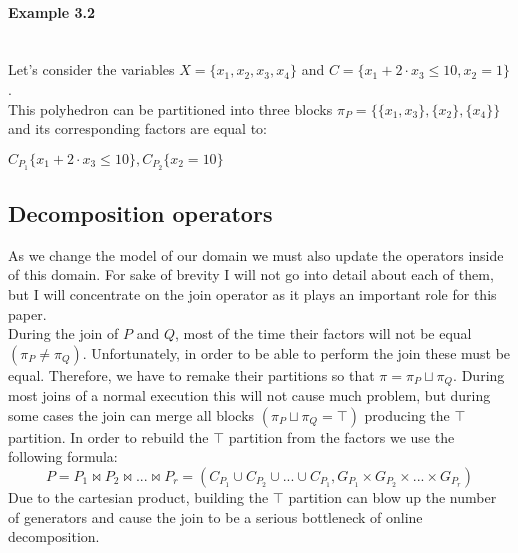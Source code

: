 
\paragraph{Example 3.2} \mbox{}\\
Let's consider the variables $X = \{x_1,x_2,x_3,x_4\}$ and $C = \{ x_1 + 2 \cdot x_3 \leq 10, x_2 = 1 \}$.\\
This polyhedron can be partitioned into three blocks $\pi_P = \{\{x_1,x_3\},\{x_2\},\{x_4\}\}$ and its corresponding factors are equal to:
\begin{center}
	$C_{P_1}\{x_1 + 2\cdot x_3 \leq 10 \} , C_{P_2}\{x_2 = 10 \}$
\end{center}


\subsection{Decomposition operators}
As we change the model of our domain we must also update the operators inside of this domain. For sake of brevity I will not go into detail about each of them, but I will concentrate on the join operator as it plays an important role for this paper.\\
During the join of $P$ and $Q$, most of the time their factors will not be equal$(\pi_P \neq \pi_Q)$. Unfortunately, in order to be able to perform the join these must be equal. 
 Therefore, we have to remake their partitions so that $\pi = \pi_P\sqcup\pi_Q$. During most joins of a normal execution this will not cause much problem, but during some cases the join can merge all blocks $(\pi_P\sqcup\pi_Q = \top)$ producing the $\top$ partition. In order to rebuild the $\top$ partition from the factors we use the following formula:
\begin{equation}
	P = P_1 \Join P_2 \Join ... \Join P_r = (C_{P_1} \cup C_{P_2} \cup ... \cup C_{P_1}, G_{P_1} \times G_{P_2} \times  ... \times   G_{P_r})
\end{equation}
Due to the cartesian product, building the $\top$ partition can blow up the number of generators and cause the join to be a serious bottleneck of online decomposition.

